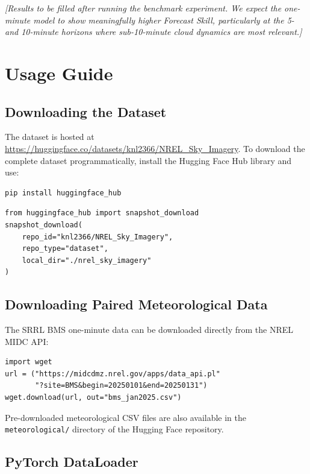 \documentclass[twoside,11pt]{article}
\begin{document}
\textit{[Results to be filled after running the benchmark experiment. We expect the one-minute model to show meaningfully higher Forecast Skill, particularly at the 5- and 10-minute horizons where sub-10-minute cloud dynamics are most relevant.]}

\section{Usage Guide}
\label{sec:usage}

\subsection{Downloading the Dataset}

The dataset is hosted at \url{https://huggingface.co/datasets/knl2366/NREL_Sky_Imagery}. To download the complete dataset programmatically, install the Hugging Face Hub library and use:

\begin{lstlisting}
pip install huggingface_hub
\end{lstlisting}

\begin{lstlisting}
from huggingface_hub import snapshot_download
snapshot_download(
    repo_id="knl2366/NREL_Sky_Imagery",
    repo_type="dataset",
    local_dir="./nrel_sky_imagery"
)
\end{lstlisting}

\subsection{Downloading Paired Meteorological Data}

The SRRL BMS one-minute data can be downloaded directly from the NREL MIDC API:

\begin{lstlisting}
import wget
url = ("https://midcdmz.nrel.gov/apps/data_api.pl"
       "?site=BMS&begin=20250101&end=20250131")
wget.download(url, out="bms_jan2025.csv")
\end{lstlisting}

Pre-downloaded meteorological CSV files are also available in the \texttt{meteorological/} directory of the Hugging Face repository.

\subsection{PyTorch DataLoader}
\end{document}
